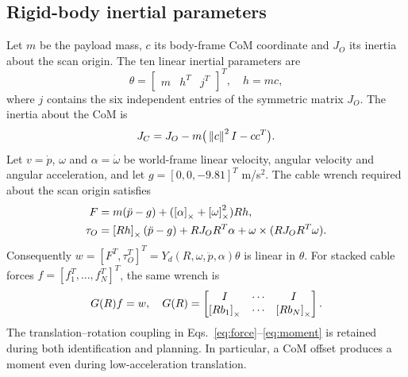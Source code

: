 \subsection{Rigid-body inertial parameters}
Let $m$ be the payload mass, $c$ its body-frame CoM coordinate and $J_O$ its inertia about the scan origin. The ten linear inertial parameters are
\begin{equation}
 \theta=\begin{bmatrix}m&h^T&j^T\end{bmatrix}^{T},\quad h=mc,
 \label{eq:theta}
\end{equation}
where $j$ contains the six independent entries of the symmetric matrix $J_O$. The inertia about the CoM is
\begin{equation}
 J_C=J_O-m\big(\left\lVert c\right\rVert^{2}I-cc^T\big).
 \label{eq:parallel}
\end{equation}
Let $v=\dot p$, $\omega$ and $\alpha=\dot\omega$ be world-frame linear velocity, angular velocity and angular acceleration, and let $g=[0,0,-9.81]^T$ m/s$^2$. The cable wrench required about the scan origin satisfies
\begin{align}
 F&=m(\ddot p-g)+(\left[\alpha\right]_{\times}+\left[\omega\right]_{\times}^{2})Rh,\label{eq:force}\\
 \tau_O&=\left[Rh\right]_{\times}(\ddot p-g)+RJ_OR^T\alpha
                 +\omega\times(RJ_OR^T\omega).\label{eq:moment}
\end{align}
Consequently $w=[F^T,\tau_O^T]^T=Y_d(R,\omega,\ddot p,\alpha)\theta$ is linear in $\theta$. For stacked cable forces $f=[f_1^T,\ldots,f_N^T]^T$, the same wrench is
\begin{equation}
 G(R)f=w,\quad
 G(R)=\begin{bmatrix} I&\cdots&I\\\left[Rb_1\right]_{\times}&\cdots&\left[Rb_N\right]_{\times}\end{bmatrix}.
 \label{eq:wrenchmap}
\end{equation}
The translation--rotation coupling in Eqs.~\eqref{eq:force}--\eqref{eq:moment} is retained during both identification and planning. In particular, a CoM offset produces a moment even during low-acceleration translation.

